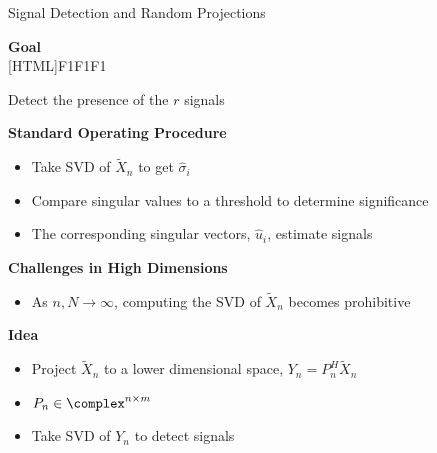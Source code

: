 \documentclass[8pt]{beamer}
\begin{document}
\begin{frame}{Signal Detection and Random Projections}

  \begin{center}
    \textbf{Goal}\\[1ex]
    [HTML]{F1F1F1}{\parbox{0.7\textwidth}{
        \centering
        Detect the presence of the $r$ signals
      }}
  \end{center}

  \vspace{2ex}

  \textbf{Standard Operating Procedure}
  \begin{itemize}
  \item Take SVD of $\widetilde{X}_n$ to get $\widehat{\sigma}_i$
  \item Compare singular values to a threshold to determine significance
  \item The corresponding singular vectors, $\widehat{u}_i$, estimate signals
  \end{itemize}

\vspace{2ex}

  \textbf{Challenges in High Dimensions}
  \begin{itemize}
  \item As $n,N\to\infty$, computing the SVD of $\widetilde{X}_n$ becomes prohibitive
  \end{itemize}

\vspace{2ex}

  \textbf{Idea}
  \begin{itemize}
  \item Project $\widetilde{X}_n$ to a lower dimensional space, $Y_n=P_n^H\widetilde{X}_n$
  \item $P_n\in\complex^{n\times m}$
  \item Take SVD of $Y_n$ to detect signals
  \end{itemize}

\end{frame}
\end{document}
